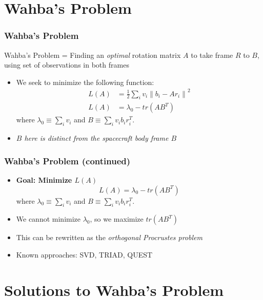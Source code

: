 \documentclass[11pt]{beamer}
\begin{document}
    \section{Wahba's Problem}\label{sec:wahbasProblem}
    \begin{frame}
        \frametitle{Wahba's Problem}
        \begin{definition}
            Wahba's Problem = Finding an \textit{optimal} rotation matrix $A$ to take frame $R$ to $B$, using set of
            observations in both frames
        \end{definition} \medskip

        \begin{itemize}
            \item<2> We seek to minimize the following function:
            \begin{align}
                L(A) &= \frac{1}{2} \sum_i v_i \left\|  b_i - Ar_i \right\|^2 \\
                L(A) &= \lambda_0 - tr(AB^T)
            \end{align}
            where $\lambda_0 \equiv \sum_i v_i$ and $B \equiv \sum_i v_i b_i r_i^T$. \medskip
            \item<2> \textit{$B$ here is distinct from the spacecraft body frame $B$}
        \end{itemize}
    \end{frame}

    \begin{frame}
        \frametitle{Wahba's Problem (continued)}
        \begin{itemize}
            \item \textbf{Goal: Minimize $L(A)$}
            \begin{equation*}
                L(A) = \lambda_0 - tr(AB^T)
            \end{equation*}
            where $\lambda_0 \equiv \sum_i v_i$ and $B \equiv \sum_i v_i b_i r_i^T$. \medskip
            \item<2-> We cannot minimize $\lambda_0$, so we maximize $tr(AB^T)$\bigskip
            \item<3> This can be rewritten as the \textit{orthogonal Procrustes problem} \bigskip
            \item<3> Known approaches: SVD, TRIAD, QUEST \bigskip
        \end{itemize}
    \end{frame}

    \section{Solutions to Wahba's Problem}\label{sec:wahbasProblemSolutions}
\end{document}
